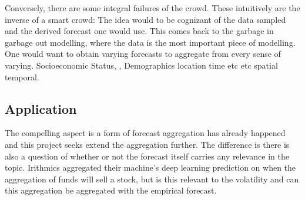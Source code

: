 Conversely, there are some integral failures of the crowd. These intuitively are the inverse of a smart crowd: 
 \cite{wiki:crowds} The idea would to be cognizant of the data sampled and the derived forecast one would use. This comes back to the garbage in garbage out modelling, where the data is the most important piece of modelling. One would want to obtain varying forecasts to aggregate from every sense of varying. Socioeconomic Status, , Demographics location time etc etc spatial temporal. 
\subsection{Application}
The compelling aspect is a form of forecast aggregation has already happened and this project seeks extend the aggregation further. The difference is there is also a question of whether or not the forecast itself carries any relevance in the topic. Irithmics aggregated their machine's deep learning prediction on when the aggregation of funds will sell a stock, but is this relevant to the volatility and can this aggregation be aggregated with the empirical forecast. 
